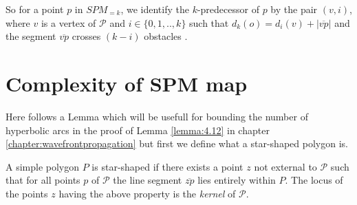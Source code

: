 So for a point $p$ in $SPM_{=k}$, we identify the $k$-predecessor of $p$ by the pair $(v,i)$, where $v$
is a vertex of $\mathcal{P}$ and $i \in \{0,1,..,k\}$ such that $d_k(o) = d_i(v) + |\overline{vp}|$ and the
segment $\overline{vp}$ crosses $(k-i)$ obstacles \cite{HershbergerKS17}.

\section{Complexity of SPM map}

Here follows a Lemma which will be usefull for bounding the number of hyperbolic arcs in the proof 
of Lemma \ref{lemma:4.12} in chapter \ref{chapter:wavefrontpropagation} but first we define what
a star-shaped polygon is.

\begin{mydef}\cite{PreparataS85}
	\label{star-shaped}
	A simple polygon $P$ is star-shaped if there exists a point $z$ not external
	to $\mathcal{P}$ such that for all points $p$ of $\mathcal{P}$ the line segment 
	$\overline{zp}$ lies entirely within $P$. The locus of the points $z$ having the 
	above property is the \emph{kernel} of $\mathcal{P}$.
\end{mydef}

